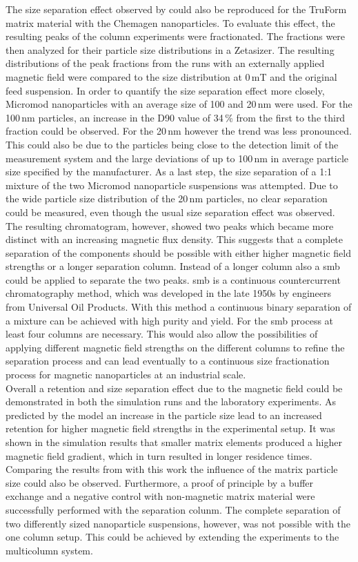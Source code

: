The size separation effect observed by \cite{AndreMaster} could also be reproduced for the TruForm matrix material with the Chemagen nanoparticles. To evaluate this effect, the resulting peaks of the column experiments were fractionated. The fractions were then analyzed for their particle size distributions in a Zetasizer. The resulting distributions of the peak fractions from the runs with an externally applied magnetic field were compared to the size distribution at 0\,mT and the original feed suspension. In order to quantify the size separation effect more closely, Micromod nanoparticles with an average size of 100 and 20\,nm were used. For the 100\,nm particles, an increase in the D90 value of 34\,\% from the first to the third fraction could be observed. For the 20\,nm however the trend was less pronounced. This could also be due to the particles being close to the detection limit of the measurement system and the large deviations of up to 100\,nm in average particle size specified by the manufacturer. As a last step, the size separation of a 1:1 mixture of the two Micromod nanoparticle suspensions was attempted. Due to the wide particle size distribution of the 20\,nm particles, no clear separation could be measured, even though the usual size separation effect was observed. The resulting chromatogram, however, showed two peaks which became more distinct with an increasing magnetic flux density. This suggests that a complete separation of the components should be possible with either higher magnetic field strengths or a longer separation column. Instead of a longer column also a \gls{smb} could be applied to separate the two peaks. \Gls{smb} is a continuous countercurrent chromatography method, which was developed in the late 1950s by engineers from Universal Oil Products\cite{broughton1961continuous,carson1962rotary}. With this method a continuous binary separation of a mixture can be achieved with high purity and yield. For the \gls{smb} process at least four columns are necessary. This would also allow the possibilities of applying different magnetic field strengths on the different columns to refine the separation process and can lead eventually to a continuous size fractionation process for magnetic nanoparticles at an industrial scale.\\

Overall a retention and size separation effect due to the magnetic field could be demonstrated in both the simulation runs and the laboratory experiments. As predicted by the model an increase in the particle size lead to an increased retention for higher magnetic field strengths in the experimental setup. It was shown in the simulation results that smaller matrix elements produced a higher magnetic field gradient, which in turn resulted in longer residence times. Comparing the results from \cite{AndreMaster} with this work the influence of the matrix particle size could also be observed. Furthermore, a proof of principle by a buffer exchange and a negative control with non-magnetic matrix material were successfully performed with the separation colunm. The complete separation of two differently sized nanoparticle suspensions, however, was not possible with the one column setup. This could be achieved by extending the experiments to the multicolumn system.